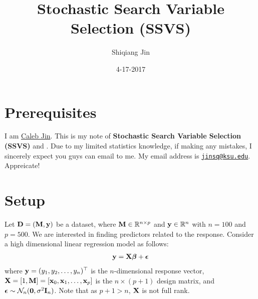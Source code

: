 \documentclass[]{book}
\title{Stochastic Search Variable Selection (SSVS)}
\author{Shiqiang Jin}
\date{4-17-2017}
\begin{document}
\maketitle

{
\setcounter{tocdepth}{1}
\tableofcontents
}
\hypertarget{prerequisites}{%
\chapter{Prerequisites}\label{prerequisites}}

I am \href{https://www.sjin.name/}{Caleb Jin}. This is my note of \textbf{Stochastic Search Variable Selection (SSVS)}\citep{George1997} and \citep{George1993}. Due to my limited statistics knowledge, if making any mistakes, I sincerely expect you guys can email to me. My email address is \href{mailto:jinsq@ksu.edu}{\nolinkurl{jinsq@ksu.edu}}. Appreicate!

\newcommand\T{{\top}}
\newcommand\ubeta{{\boldsymbol \beta}}
\newcommand\uSigma{{\boldsymbol \Sigma}}
\newcommand\uepsilon{{\boldsymbol \epsilon}}
\newcommand\umu{{\boldsymbol \mu}}
\newcommand\utheta{{\boldsymbol \theta}}
\newcommand\bg{{\boldsymbol \gamma}}
\newcommand\0{{\bf 0}}
\newcommand\uX{{\bf X}}
\newcommand\uD{{\bf D}}
\newcommand\ux{{\bf x}}
\newcommand\uY{{\bf Y}}
\newcommand\uy{{\bf y}}
\newcommand\uz{{\bf z}}
\newcommand\uI{{\bf I}}
\newcommand\uA{{\bf A}}
\newcommand\uB{{\bf B}}
\newcommand\uH{{\bf H}}
\newcommand\uM{{\bf M}}
\newcommand\uV{{\bf V}}
\newcommand\diag{{\rm diag}}

\hypertarget{setup}{%
\chapter{Setup}\label{setup}}

Let \({\bf D}=({\bf M},{\bf y})\) be a dataset, where \({\bf M}\in \mathbb{R}^{n\times p}\) and \({\bf y}\in \mathbb{R}^{n}\) with \(n=100\) and \(p=500\). We are interested in finding predictors related to the response.
Consider a high dimensional linear regression model as follows:
\begin{eqnarray}
{\bf y}={\bf X}{\boldsymbol \beta}+ {\boldsymbol \epsilon}
\label{eq:1}
\end{eqnarray}
where \({\bf y}=(y_1,y_2,\ldots,y_{n})^{{\top}}\) is the \(n\)-dimensional response vector, \({\bf X}=[1,{\bf M}]=[{\bf x}_0, {\bf x}_1,\ldots,{\bf x}_{p}]\) is the \(n\times (p+1)\) design
matrix, and \({\boldsymbol \epsilon}\sim \mathcal{N}_{n}({\bf 0},\sigma^2{\bf I}_{n})\). Note that as \(p+1>n\), \({\bf X}\) is not full rank.
\end{document}
